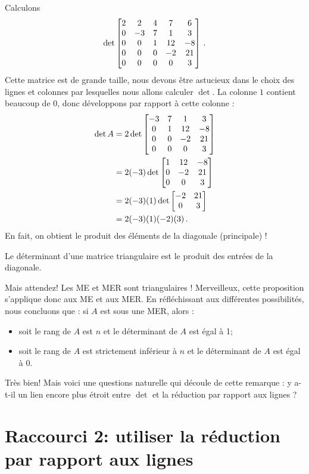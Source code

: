 \begin{myexample}
Calculons
$$
\det \left[ \begin{matrix} 
2 & 2 & 4 & 7 & 6\\
0 & -3 & 7 & 1 & 3\\
0 & 0 & 1 & 12 & -8\\
0 & 0 & 0 & -2 & 21\\
0 & 0 & 0 & 0  & 3 \end{matrix} \right]\,.
$$
Cette matrice est de grande taille, nous devons être astucieux dans le choix des lignes et colonnes par lesquelles nous allons calculer $\det$. La colonne $1$ contient beaucoup de $0$, donc développons par rapport à cette colonne :
\begin{align*}
\det A &= 2 \det\left[ \begin{matrix} -3 & 7 & 1 & 3\\ 0 & 1 & 12 & -8 \\ 0 & 0 & -2 & 21\\ 0 & 0 & 0 & 3 \end{matrix} \right] \\
&= 2 (-3) \det\left[ \begin{matrix} 1 & 12 & -8\\ 0 & -2 & 21\\ 0 & 0 & 3 \end{matrix} \right]\\
&= 2(-3)(1) \det\left[ \begin{matrix} -2 & 21 \\ 0 & 3 \end{matrix} \right]\\
&= 2(-3)(1)(-2)(3)\,.
\end{align*}
En fait, on obtient le produit des éléments de la diagonale (principale) !
\end{myexample}

\begin{proposition}
Le déterminant d'une matrice triangulaire est le produit
des entrées de la diagonale.
\end{proposition}

Mais attendez! Les ME et MER sont triangulaires ! Merveilleux, cette
proposition s'applique donc aux ME et aux MER.  En réfléchissant aux différentes possibilités, nous
concluons que : si $A$ est sous une MER, alors :
\begin{itemize}
\item soit le rang de $A$ est $n$ et le d\'eterminant de $A$ est \'egal \`a 1;
\item soit le rang de $A$ est strictement inf\'erieur \`a $n$ et le d\'eterminant de $A$ est \'egal \`a 0.
\end{itemize}
Très bien!  Mais voici une questions naturelle qui découle de cette remarque : y a-t-il un lien encore plus étroit entre $\det$ et la réduction par rapport aux lignes ?

\section{Raccourci 2:  utiliser la réduction par rapport aux lignes}

